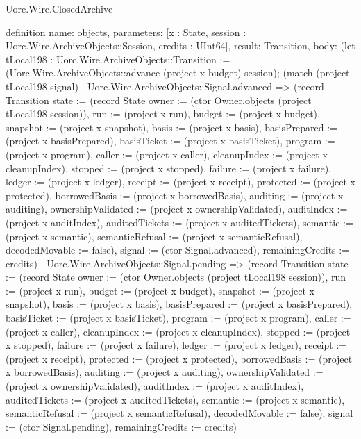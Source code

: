 \begin{lexlean}{Uorc.Wire.ClosedArchive}
\begin{semanticmodule}
definition{
  name: objects,
  parameters: [x : State, session : Uorc.Wire.ArchiveObjects::Session, credits : UInt64],
  result: Transition,
  body: (let tLocal198 : Uorc.Wire.ArchiveObjects::Transition := (Uorc.Wire.ArchiveObjects::advance (project x budget) session); (match (project tLocal198 signal)
    | Uorc.Wire.ArchiveObjects::Signal.advanced => (record Transition {state := (record State {owner := (ctor Owner.objects (project tLocal198 session)), run := (project x run), budget := (project x budget), snapshot := (project x snapshot), basis := (project x basis), basisPrepared := (project x basisPrepared), basisTicket := (project x basisTicket), program := (project x program), caller := (project x caller), cleanupIndex := (project x cleanupIndex), stopped := (project x stopped), failure := (project x failure), ledger := (project x ledger), receipt := (project x receipt), protected := (project x protected), borrowedBasis := (project x borrowedBasis), auditing := (project x auditing), ownershipValidated := (project x ownershipValidated), auditIndex := (project x auditIndex), auditedTickets := (project x auditedTickets), semantic := (project x semantic), semanticRefusal := (project x semanticRefusal), decodedMovable := false}), signal := (ctor Signal.advanced), remainingCredits := credits})
    | Uorc.Wire.ArchiveObjects::Signal.pending => (record Transition {state := (record State {owner := (ctor Owner.objects (project tLocal198 session)), run := (project x run), budget := (project x budget), snapshot := (project x snapshot), basis := (project x basis), basisPrepared := (project x basisPrepared), basisTicket := (project x basisTicket), program := (project x program), caller := (project x caller), cleanupIndex := (project x cleanupIndex), stopped := (project x stopped), failure := (project x failure), ledger := (project x ledger), receipt := (project x receipt), protected := (project x protected), borrowedBasis := (project x borrowedBasis), auditing := (project x auditing), ownershipValidated := (project x ownershipValidated), auditIndex := (project x auditIndex), auditedTickets := (project x auditedTickets), semantic := (project x semantic), semanticRefusal := (project x semanticRefusal), decodedMovable := false}), signal := (ctor Signal.pending), remainingCredits := credits})
}
\end{semanticmodule}
\end{lexlean}
